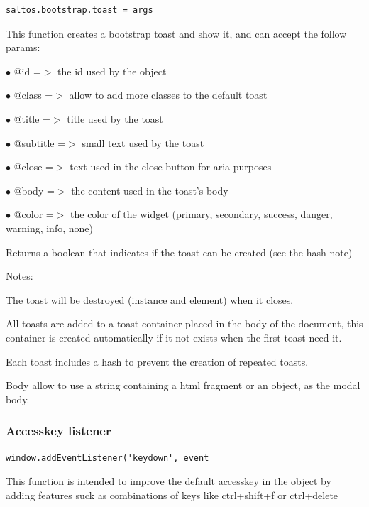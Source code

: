 \documentclass[a4paper]{article}
\begin{document}
\begin{lstlisting}
saltos.bootstrap.toast = args
\end{lstlisting}

This function creates a bootstrap toast and show it, and can accept the follow params:

\begin{compactitem}
\item[\color{myblue}$\bullet$] @id       =$>$ the id used by the object
\item[\color{myblue}$\bullet$] @class    =$>$ allow to add more classes to the default toast
\item[\color{myblue}$\bullet$] @title    =$>$ title used by the toast
\item[\color{myblue}$\bullet$] @subtitle =$>$ small text used by the toast
\item[\color{myblue}$\bullet$] @close    =$>$ text used in the close button for aria purposes
\item[\color{myblue}$\bullet$] @body     =$>$ the content used in the toast's body
\item[\color{myblue}$\bullet$] @color    =$>$ the color of the widget (primary, secondary, success, danger, warning, info, none)
\end{compactitem}

Returns a boolean that indicates if the toast can be created (see the hash note)

Notes:

The toast will be destroyed (instance and element) when it closes.

All toasts are added to a toast-container placed in the body of the document, this container
is created automatically if it not exists when the first toast need it.

Each toast includes a hash to prevent the creation of repeated toasts.

Body allow to use a string containing a html fragment or an object, as the modal body.

\hypertarget{toc109}{}
\subsubsection{Accesskey listener}

\begin{lstlisting}
window.addEventListener('keydown', event
\end{lstlisting}

This function is intended to improve the default accesskey in the object by
adding features suck as combinations of keys like ctrl+shift+f or ctrl+delete
\end{document}
